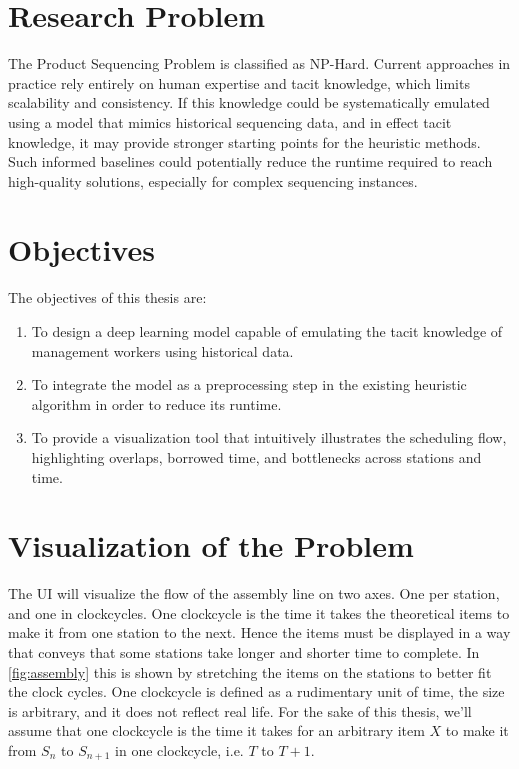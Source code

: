 \documentclass[12pt,a4paper]{report}
\begin{document}
\section{Research Problem}
The Product Sequencing Problem is classified as NP-Hard. Current approaches in practice rely entirely on human expertise and tacit knowledge, which limits scalability and consistency. If this knowledge could be systematically emulated using a model that mimics historical sequencing data, and in effect tacit knowledge, it may provide stronger starting points for the heuristic methods. Such informed baselines could potentially reduce the runtime required to reach high-quality solutions, especially for complex sequencing instances.

\section{Objectives}
The objectives of this thesis are:
\begin{enumerate}
    \item To design a deep learning model capable of emulating the tacit knowledge of management workers using historical data.
    \item To integrate the model as a preprocessing step in the existing heuristic algorithm in order to reduce its runtime.
    \item To provide a visualization tool that intuitively illustrates the scheduling flow, highlighting overlaps, borrowed time, and bottlenecks across stations and time.
\end{enumerate}

\section{Visualization of the Problem}
    The UI will visualize the flow of the assembly line on two axes. One per station, and one in clockcycles. One clockcycle is the time it takes the theoretical items to make it from one station to the next. Hence the items must be displayed in a way that conveys that some stations take longer and shorter time to complete. In \autoref{fig:assembly} this is shown by stretching the items on the stations to better fit the clock cycles. One clockcycle is defined as a rudimentary unit of time, the size is arbitrary, and it does not reflect real life. For the sake of this thesis, we'll assume that one clockcycle is the time it takes for an arbitrary item $X$ to make it from $S_n$ to $S_{n+1}$ in one clockcycle, i.e. $T$ to $T + 1$.
\end{document}
